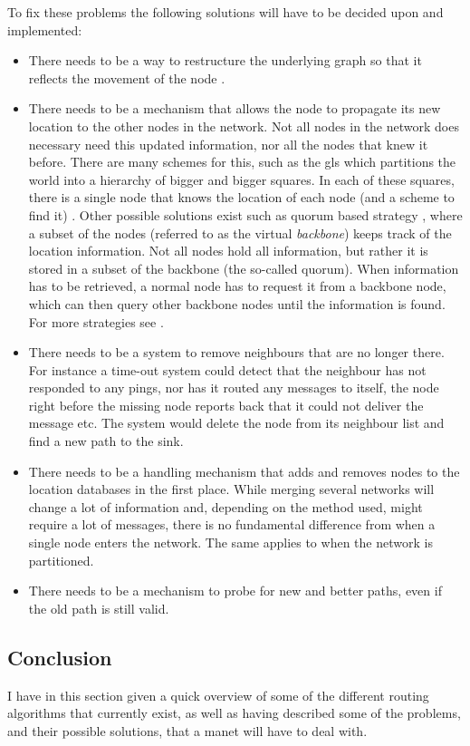 To fix these problems the following solutions will have to be decided upon and implemented:
\begin{itemize}
\item There needs to be a way to restructure the underlying graph so that it reflects the movement of the node \cite{practical}.
\item There needs to  be a mechanism that allows the node to propagate its new location to the other nodes in the network. Not all nodes in the network does necessary need this updated information, nor all the nodes that knew it before. There are many schemes for this, such as the \ac{gls} \cite{scaleLocation} which partitions the world into a hierarchy of bigger and bigger squares. In each of these squares, there is a single node that knows the location of each node (and a scheme to find it) \cite{scaleLocation}. Other possible solutions exist such as quorum based strategy \cite{quorum_basic}, where a subset of the nodes (referred to as the virtual \emph{backbone}) keeps track of the location information. Not all nodes hold all information, but rather it is stored in a subset of the backbone (the so-called quorum). When information has to be retrieved, a normal node has to request it from a backbone node, which can then query other backbone nodes until the information is found. For more strategies see \cite{surveyPosition}.
\item There needs to be a system to remove neighbours that are no longer there. For instance a time-out system could detect that the neighbour has not responded to any pings, nor has it routed any messages to itself, the node right before the missing node reports back that it could not deliver the message etc. The system would delete the node from its neighbour list and find a new path to the sink.
\item There needs to be a handling mechanism that adds and removes nodes to the location databases in the first place. While merging several networks will change a lot of information and, depending on the method used, might require a lot of messages, there is no fundamental difference from when a single node enters the network. The same applies to when the network is partitioned. 
\item There needs to be a mechanism to probe for new and better paths, even if the old path is still valid.
\end{itemize}


\subsection{Conclusion}

I have in this section given a quick overview of some of the different routing algorithms that currently exist, as well as having described some of the problems, and their possible solutions, that a \ac{manet} will have to deal with.
